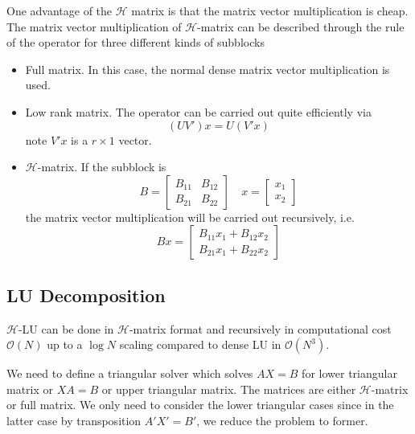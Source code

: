 \documentclass[3p,,preprint,12pt]{elsarticle}
\theoremstyle{definition}
\begin{document}
One advantage of the $\mathcal{H}$ matrix is that the matrix vector multiplication is cheap. The matrix vector multiplication of $\mathcal{H}$-matrix can be described through the rule of the operator for three different kinds of subblocks
\begin{itemize}
	\item Full matrix. In this case, the normal dense matrix vector multiplication is used. 
	\item Low rank matrix. The operator can be carried out quite efficiently via
	\begin{equation}
		(UV')x = U(V'x)
	\end{equation}
	note $V'x$ is a $r\times 1$ vector.
	\item $\mathcal{H}$-matrix. If the subblock is 
	\begin{equation}
		B = \begin{bmatrix}
			B_{11}&B_{12}\\
			B_{21}&B_{22}
		\end{bmatrix}\quad x = \begin{bmatrix}
			x_1\\
			x_2
		\end{bmatrix}
	\end{equation}
	the matrix vector multiplication will be carried out recursively, i.e.
	\begin{equation}
		Bx = \begin{bmatrix}
			B_{11} x_1 + B_{12}x_2\\
			B_{21} x_1 + B_{22}x_2
		\end{bmatrix}
	\end{equation}
\end{itemize}





\subsection{LU Decomposition}

$\mathcal{H}$-LU can be done in $\mathcal{H}$-matrix format and recursively in computational cost $\mathcal{O}(N)$ up to a $\log N$ scaling compared to dense LU in $\mathcal{O}(N^3)$.


We need to define a triangular solver which solves $AX=B$ for lower triangular matrix or $XA = B$ or upper triangular matrix. The matrices are either $\mathcal{H}$-matrix or full matrix. We only need to consider the lower triangular cases since in the latter case by transposition $A'X'=B'$, we reduce the problem to former. 
\end{document}
